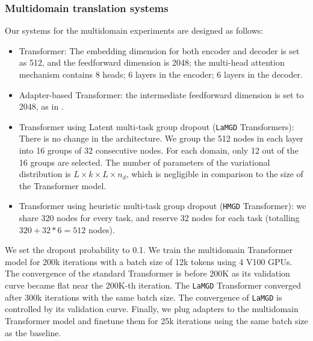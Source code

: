 \documentclass[11pt]{article}
\newcommand{\fyDone}[1]{\done[FY]\Todo[FY:]{\textcolor{orange}{#1}}}
\newcommand{\system}[1]{\texttt{{#1}}}
\begin{document}
\subsubsection{Multidomain translation systems}
Our systems for the multidomain experiments are designed as follows:
\begin{itemize}
\item Transformer: The embedding dimension for both encoder and decoder is set as 512, and the feedforward dimension is 2048; the multi-head attention mechanism contains 8 heads; 6 layers in the encoder; 6 layers in the decoder.\fyDone{How many layers}
\item Adapter-based Transformer: the intermediate feedforward dimension is set to 2048, as in \citet{Pham21revisiting}.
\item Transformer using Latent multi-task group dropout (\system{LaMGD} Transformers):\fyDone{Explain acronym} There is no change in the architecture. We group the 512 nodes in each layer into 16 groups of 32 consecutive nodes. For each domain, only 12 out of the 16 groups are selected. The number of parameters of the variational distribution is $L\times k \times L \times n_d$, which is negligible in comparison to the size of the Transformer model.
\item Transformer using heuristic multi-task group dropout (\system{HMGD} Transformer): we share 320 nodes for every task, and reserve 32 nodes for each task (totalling $320 + 32*6 = 512$ nodes).
\end{itemize}

We set the dropout probability to 0.1. We train the multidomain Transformer model for 200k iterations with a batch size of 12k tokens using 4 V100 GPUs. The convergence of the standard Transformer is before 200K as its validation curve became flat near the 200K-th iteration. The \system{LaMGD} Transformer converged after 300k iterations with the same batch size. The convergence of \system{LaMGD} is controlled by its validation curve. Finally, we plug adapters to the multidomain Transformer model and finetune them for 25k iterations using the same batch size as the baseline.
\end{document}
